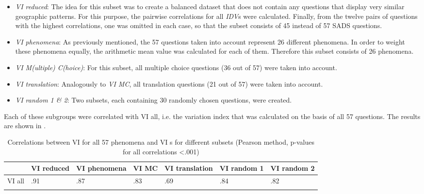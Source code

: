 \documentclass[output=paper]{LSP/langsci}
\begin{document}
\begin{itemize}
\item \emph{VI reduced}: The idea for this subset was to create a balanced dataset that does not contain any questions that display very similar geographic patterns. For this purpose, the pairwise correlations for all \emph{IDV}s were calculated. Finally, from the twelve pairs of questions with the highest correlations, one was omitted in each case, so that the subset consists of 45 instead of 57 SADS questions.
\item \emph{VI phenomena}: As previously mentioned, the 57 questions taken into account represent 26 different phenomena. In order to weight these phenomena equally, the arithmetic mean value was calculated for each of them. Therefore this subset consists of 26 phenomena.
\item \emph{VI M(ultiple) C(hoice)}: For this subset, all multiple choice questions (36 out of 57) were taken into account.
\item \emph{VI translation}: Analogously to \emph{VI MC}, all translation questions (21 out of 57) were taken into account.
\item \emph{VI random 1 \& 2}: Two subsets, each containing 30 randomly chosen questions, were created.
\end{itemize}

Each of these subgroups were correlated with VI all, i.e. the variation index that was calculated on the basis of all 57 questions. The results are shown in .

\begin{table}
\begin{tabular}{lllllll}
\lsptoprule
\begin{minipage}[t]{0.11\textwidth}\end{minipage}& 
\begin{minipage}[t]{0.11\textwidth}VI reduced\end{minipage} & 
\begin{minipage}[t]{0.11\textwidth}VI phenomena\end{minipage} & 
\begin{minipage}[t]{0.11\textwidth}VI MC\end{minipage} & 
\begin{minipage}[t]{0.11\textwidth}VI translation\end{minipage} & 
\begin{minipage}[t]{0.11\textwidth}VI random 1\end{minipage} & 
\begin{minipage}[t]{0.11\textwidth}VI random 2\end{minipage}\\
\midrule
VI all & .91 & .87 & .83 & .69 & .84 & .82\\
\lspbottomrule
\end{tabular}
\label{tab:1}
\caption{Correlations between VI for all 57 phenomena and VI s for different subsets (Pearson method, p-values for all correlations {\textless}.001)}
\end{table}
\end{document}
